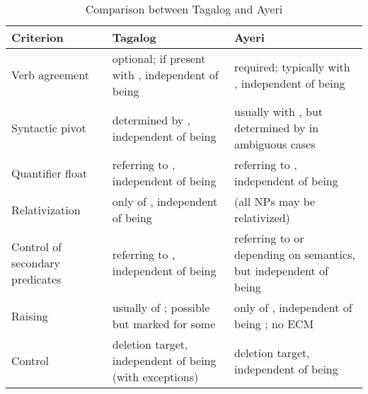 \begin{table} \centering
\caption[Comparison between Tagalog and Ayeri]{Comparison between Tagalog
\citep{kroeger1991} and Ayeri}
\begin{tabu} to 
\toprule\tableheaderfont
Criterion
	& Tagalog
	& Ayeri
	\\

\toprule

Verb agreement
	& optional; if present with \Nom{}, independent of being \Aarg{}
	& required; typically with \Aarg{}, independent of being \Top{}
	\\

\midrule

Syntactic pivot
	& determined by \Nom{}, independent of being \Aarg{}
	& usually with \Aarg{}, but determined by \Top{} in ambiguous cases
	\\

\midrule

Quantifier float
	& referring to \Nom{}, independent of being \Aarg{}
	& referring to \Aarg{}, independent of being \Top{}
	\\

\midrule

Relativization
	& only of \Nom{}, independent of being \Aarg{}
	& (all NPs may be relativized)
	\\

\midrule

Control of secondary predicates
	& referring to \Nom{}, independent of being \Aarg{}
	& referring to \Aarg{} or \Parg{} depending on semantics, but 
		independent of being \Top{}
	\\

\midrule

Raising
	& usually of \Nom{}; \Aarg{} possible but marked for some
	& only of \Aarg{}, independent of being \Top{}; no ECM
	\\

\midrule

Control
	& \Aarg{} deletion target, independent of being \Nom{} (with exceptions)
	& \Aarg{} deletion target, independent of being \Top{}
	\\

\bottomrule
\end{tabu}
\label{tab:tagayrcomp}
\end{table}

